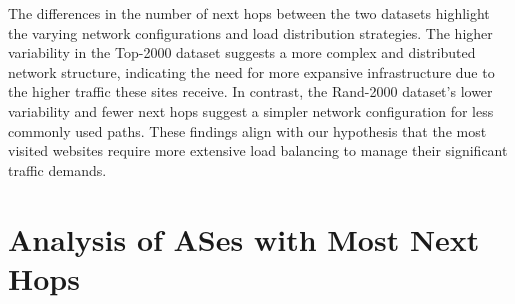 \documentclass[12pt]{cwru_thesis}
\begin{document}
The differences in the number of next hops between the two datasets highlight the varying network configurations and load distribution strategies. The higher variability in the Top-2000 dataset suggests a more complex and distributed network structure, indicating the need for more expansive infrastructure due to the higher traffic these sites receive. In contrast, the Rand-2000 dataset's lower variability and fewer next hops suggest a simpler network configuration for less commonly used paths. These findings align with our hypothesis that the most visited websites require more extensive load balancing to manage their significant traffic demands.

\section{Analysis of ASes with Most Next Hops}
\end{document}
